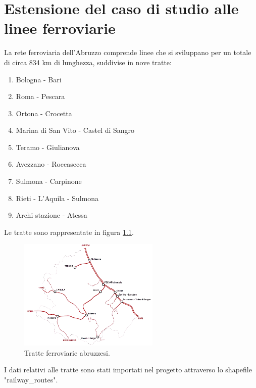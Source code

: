 
\chapter{Estensione del caso di studio alle linee ferroviarie} 

La rete ferroviaria dell'Abruzzo comprende linee che si sviluppano per un totale di circa 834 km di lunghezza, suddivise in nove tratte:

\begin{enumerate}
	\item Bologna - Bari
	\item Roma - Pescara
	\item Ortona - Crocetta
	\item Marina di San Vito - Castel di Sangro
	\item Teramo - Giulianova
	\item Avezzano - Roccasecca
	\item Sulmona - Carpinone
	\item Rieti - L'Aquila - Sulmona
	\item Archi stazione - Atessa
\end{enumerate}

Le tratte sono rappresentate in figura \ref{abruzzo_tratte}.

\begin{figure}[h]
	\centering
	\includegraphics[width=0.6\textwidth]{images/Mappa_ferrovie_abruzzesi}
	\caption{Tratte ferroviarie abruzzesi.}
	\label{abruzzo_tratte}
\end{figure}

I dati relativi alle tratte sono stati importati nel progetto attraverso lo shapefile "railway\_routes". 
